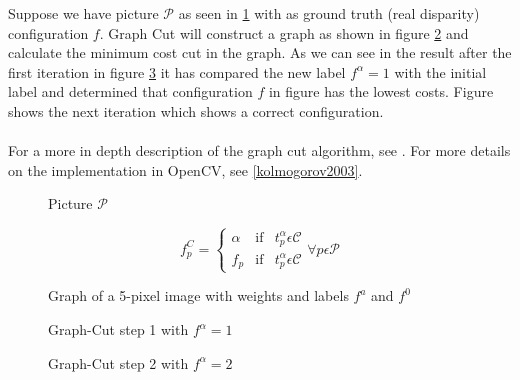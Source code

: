 \documentclass[a4paper]{article}
\begin{document}
Suppose we have picture $\mathcal{P}$ as seen in \ref{fig:pictureP} with as ground truth (real disparity) configuration $f$.
Graph Cut will construct a graph as shown in figure \ref{fig:gc_end_result} and calculate the minimum cost cut in the graph.
As we can see in the result after the first iteration in figure \ref{fig:gcstep1} it has compared the new label $f^{\alpha} = 1$ with 
the initial label and determined that configuration $f$ in figure \label{fig:gcstep1} has the lowest costs. Figure \label{fig:gcstep2} shows 
the next iteration which shows a correct configuration.\\\\

For a more in depth description of the graph cut algorithm, see
\cite{zabih2001}. For more details on the implementation in OpenCV,
see \ref{kolmogorov2003}.

\begin{figure}[h!bt]
\centering
\begin{minipage}[h]{.4\linewidth}

\end{minipage}
\hspace{.1\linewidth}
\begin{minipage}[h]{.4\linewidth}

\end{minipage}
\caption{Picture $\mathcal{P}$}
\label{fig:pictureP}
\end{figure}
\begin{equation}
 f_{p}^{C} = \left\{
  \begin{array}{lll}
  \alpha & \text{if} & t^{\alpha}_{p} \epsilon \mathcal{C} \\ 
  f_{p}  & \text{if} & t^{\alpha}_{p} \epsilon \mathcal{C}
  \end{array}
\right.
 \forall p \epsilon \mathcal{P}
\label{eq: fC}
\end{equation}

\begin{figure}[h!bt]
\centering

\caption{Graph of a 5-pixel image with weights and labels $f^a$ and $f^0$}
\label{fig:gc_end_result}
\end{figure}

\begin{figure}[h!bt]
\centering


\caption{Graph-Cut step 1 with $f^\alpha = 1$}                                             
\label{fig:gcstep1}
\end{figure}
\begin{figure}[h!bt]
\centering


\caption{Graph-Cut step 2 with $f^\alpha = 2$}
\label{fig:gcstep2}
\end{figure}
\end{document}
